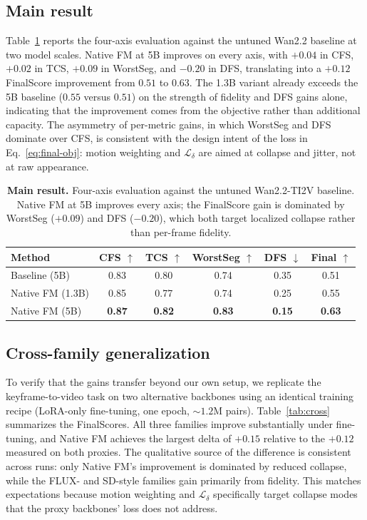 \documentclass[10pt,twocolumn]{article}
\begin{document}
\subsection{Main result}\label{sec:main-result}

Table~\ref{tab:score} reports the four-axis evaluation against the untuned Wan2.2 baseline at two model scales. Native FM at 5B improves on every axis, with $+0.04$ in CFS, $+0.02$ in TCS, $+0.09$ in WorstSeg, and $-0.20$ in DFS, translating into a $+0.12$ FinalScore improvement from $0.51$ to $0.63$. The 1.3B variant already exceeds the 5B baseline ($0.55$ versus $0.51$) on the strength of fidelity and DFS gains alone, indicating that the improvement comes from the objective rather than additional capacity. The asymmetry of per-metric gains, in which WorstSeg and DFS dominate over CFS, is consistent with the design intent of the loss in Eq.~\eqref{eq:final-obj}: motion weighting and $\mathcal{L}_\delta$ are aimed at collapse and jitter, not at raw appearance.

\begin{table}[H]
\centering
\small
\caption{\textbf{Main result.} Four-axis evaluation against the untuned Wan2.2-TI2V baseline. Native FM at 5B improves every axis; the FinalScore gain is dominated by WorstSeg ($+0.09$) and DFS ($-0.20$), which both target localized collapse rather than per-frame fidelity.\label{tab:score}}
\setlength{\tabcolsep}{4pt}
\begin{tabular}{lccccc}
\toprule
Method & CFS $\uparrow$ & TCS $\uparrow$ & WorstSeg $\uparrow$ & DFS $\downarrow$ & Final $\uparrow$ \\
\midrule
Baseline (5B)        & 0.83 & 0.80 & 0.74 & 0.35 & 0.51 \\
Native FM (1.3B)     & 0.85 & 0.77 & 0.74 & 0.25 & 0.55 \\
Native FM (5B)       & \textbf{0.87} & \textbf{0.82} & \textbf{0.83} & \textbf{0.15} & \textbf{0.63} \\
\bottomrule
\end{tabular}
\end{table}

\subsection{Cross-family generalization}\label{sec:cross-family}

To verify that the gains transfer beyond our own setup, we replicate the keyframe-to-video task on two alternative backbones using an identical training recipe (LoRA-only fine-tuning, one epoch, $\sim$$1.2$M pairs). Table~\ref{tab:cross} summarizes the FinalScores. All three families improve substantially under fine-tuning, and Native FM achieves the largest delta of $+0.15$ relative to the $+0.12$ measured on both proxies. The qualitative source of the difference is consistent across runs: only Native FM's improvement is dominated by reduced collapse, while the FLUX- and SD-style families gain primarily from fidelity. This matches expectations because motion weighting and $\mathcal{L}_\delta$ specifically target collapse modes that the proxy backbones' loss does not address.
\end{document}
